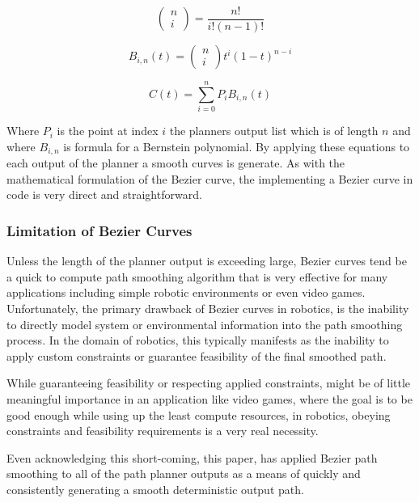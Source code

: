 \begin{equation}
    \left(\begin{array}{l}
    n \\
    i
    \end{array}\right)=\frac{n !}{i !(n-1) !}
\end{equation}

\begin{equation}
    B_{i, n}(t)=\left(\begin{array}{c}
    n \\
    i
    \end{array}\right) t^i(1-t)^{n-i}
\end{equation}

\begin{equation}
    C(t)=\sum_{i=0}^n P_i B_{i, n}(t)
\end{equation}

Where $P_i$ is the point at index $i$ the planners output list which is of length $n$ and where $B_{i, n}$ is formula for a Bernstein polynomial. By applying these equations to each output of the planner a smooth curves is generate. As with the mathematical formulation of the Bezier curve, the implementing a Bezier curve in code is very direct and straightforward.

\newline

\subsubsection{Limitation of Bezier Curves}
Unless the length of the planner output is exceeding large, Bezier curves tend be a quick to compute path smoothing algorithm that is very effective for many applications including simple robotic environments or even video games. Unfortunately, the primary drawback of Bezier curves in robotics, is the inability to directly model system or environmental information into the path smoothing process. In the domain of robotics, this typically manifests as the inability to apply custom constraints or guarantee feasibility of the final smoothed path.  

While guaranteeing feasibility or respecting applied constraints, might be of little meaningful importance in an application like video games, where the goal is to be good enough while using up the least compute resources, in robotics, obeying constraints and feasibility requirements is a very real necessity.

Even acknowledging this short-coming, this paper, has applied Bezier path smoothing to all of the path planner outputs as a means of quickly and consistently generating a smooth deterministic output path.

